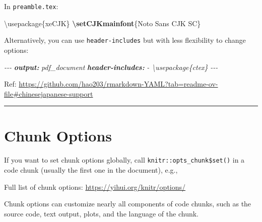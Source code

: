\documentclass[
  a4paper,
  twoside,
  openright]{book}
\newenvironment{Shaded}{\begin{snugshade}}{\end{snugshade}}
\newcommand{\AnnotationTok}[1]{\textcolor[rgb]{0.56,0.35,0.01}{\textbf{\textit{#1}}}}
\newcommand{\BuiltInTok}[1]{#1}
\newcommand{\CommentTok}[1]{\textcolor[rgb]{0.56,0.35,0.01}{\textit{#1}}}
\newcommand{\ExtensionTok}[1]{#1}
\newcommand{\FunctionTok}[1]{\textcolor[rgb]{0.13,0.29,0.53}{\textbf{#1}}}
\newcommand{\InformationTok}[1]{\textcolor[rgb]{0.56,0.35,0.01}{\textbf{\textit{#1}}}}
\newcommand{\NormalTok}[1]{#1}
\theoremstyle{definition}
\theoremstyle{definition}
\theoremstyle{definition}
\theoremstyle{definition}
\theoremstyle{remark}
\begin{document}
In \texttt{preamble.tex}:

\begin{Shaded}
\begin{Highlighting}[]
\BuiltInTok{\textbackslash{}usepackage}\NormalTok{\{}\ExtensionTok{xeCJK}\NormalTok{\}  }
\FunctionTok{\textbackslash{}setCJKmainfont}\NormalTok{\{Noto Sans CJK SC\}}
\end{Highlighting}
\end{Shaded}

Alternatively, you can use \texttt{header-includes} but with less flexibility to change options:

\begin{Shaded}
\begin{Highlighting}[]
\CommentTok{{-}{-}{-}}
\AnnotationTok{output:}\CommentTok{ pdf\_document}
\AnnotationTok{header{-}includes:}
\CommentTok{  {-} \textbackslash{}usepackage\{ctex\}}
\CommentTok{{-}{-}{-}}
\end{Highlighting}
\end{Shaded}

Ref: \url{https://github.com/hao203/rmarkdown-YAML?tab=readme-ov-file\#chinesejapanese-support}

\begin{center}\rule{0.5\linewidth}{0.5pt}\end{center}

\section{Chunk Options}\label{chunk-options}

If you want to set chunk options globally, call \texttt{knitr::opts\_chunk\$set()} in a code chunk (usually the first one in the document), e.g.,

\begin{Shaded}
\end{Shaded}

Full list of chunk options: \url{https://yihui.org/knitr/options/}

Chunk options can customize nearly all components of code chunks, such as the source code, text output, plots, and the language of the chunk.
\end{document}
